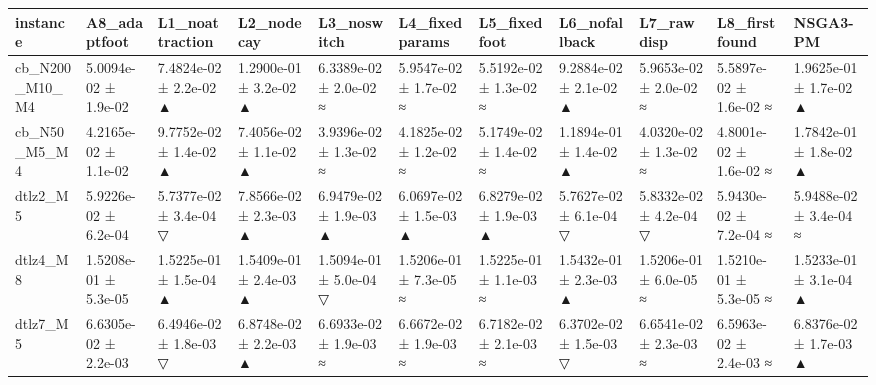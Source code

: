 \begin{tabular}{lllllllllll}
\toprule
instance & A8\_adaptfoot & L1\_noattraction & L2\_nodecay & L3\_noswitch & L4\_fixedparams & L5\_fixedfoot & L6\_nofallback & L7\_rawdisp & L8\_firstfound & NSGA3-PM \\
\midrule
cb\_N200\_M10\_M4 & 5.0094e-02 ± 1.9e-02 & 7.4824e-02 ± 2.2e-02 ▲ & 1.2900e-01 ± 3.2e-02 ▲ & 6.3389e-02 ± 2.0e-02 ≈ & 5.9547e-02 ± 1.7e-02 ≈ & 5.5192e-02 ± 1.3e-02 ≈ & 9.2884e-02 ± 2.1e-02 ▲ & 5.9653e-02 ± 2.0e-02 ≈ & 5.5897e-02 ± 1.6e-02 ≈ & 1.9625e-01 ± 1.7e-02 ▲ \\
cb\_N50\_M5\_M4 & 4.2165e-02 ± 1.1e-02 & 9.7752e-02 ± 1.4e-02 ▲ & 7.4056e-02 ± 1.1e-02 ▲ & 3.9396e-02 ± 1.3e-02 ≈ & 4.1825e-02 ± 1.2e-02 ≈ & 5.1749e-02 ± 1.4e-02 ≈ & 1.1894e-01 ± 1.4e-02 ▲ & 4.0320e-02 ± 1.3e-02 ≈ & 4.8001e-02 ± 1.6e-02 ≈ & 1.7842e-01 ± 1.8e-02 ▲ \\
dtlz2\_M5 & 5.9226e-02 ± 6.2e-04 & 5.7377e-02 ± 3.4e-04 ▽ & 7.8566e-02 ± 2.3e-03 ▲ & 6.9479e-02 ± 1.9e-03 ▲ & 6.0697e-02 ± 1.5e-03 ▲ & 6.8279e-02 ± 1.9e-03 ▲ & 5.7627e-02 ± 6.1e-04 ▽ & 5.8332e-02 ± 4.2e-04 ▽ & 5.9430e-02 ± 7.2e-04 ≈ & 5.9488e-02 ± 3.4e-04 ≈ \\
dtlz4\_M8 & 1.5208e-01 ± 5.3e-05 & 1.5225e-01 ± 1.5e-04 ▲ & 1.5409e-01 ± 2.4e-03 ▲ & 1.5094e-01 ± 5.0e-04 ▽ & 1.5206e-01 ± 7.3e-05 ≈ & 1.5225e-01 ± 1.1e-03 ≈ & 1.5432e-01 ± 2.3e-03 ▲ & 1.5206e-01 ± 6.0e-05 ≈ & 1.5210e-01 ± 5.3e-05 ≈ & 1.5233e-01 ± 3.1e-04 ▲ \\
dtlz7\_M5 & 6.6305e-02 ± 2.2e-03 & 6.4946e-02 ± 1.8e-03 ▽ & 6.8748e-02 ± 2.2e-03 ▲ & 6.6933e-02 ± 1.9e-03 ≈ & 6.6672e-02 ± 1.9e-03 ≈ & 6.7182e-02 ± 2.1e-03 ≈ & 6.3702e-02 ± 1.5e-03 ▽ & 6.6541e-02 ± 2.3e-03 ≈ & 6.5963e-02 ± 2.4e-03 ≈ & 6.8376e-02 ± 1.7e-03 ▲ \\
\bottomrule
\end{tabular}

